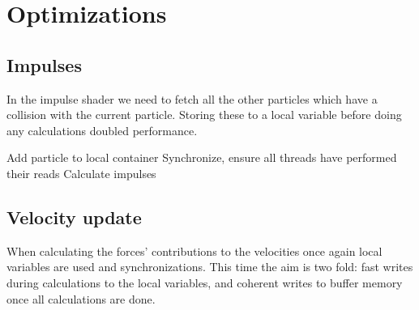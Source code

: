 \section{Optimizations}
\subsection{Impulses}
In the impulse shader we need to fetch all the other particles which have a collision
with the current particle. Storing these to a local variable before doing any
calculations doubled performance.

\begin{algorithm}[H]
  \begin{algorithmic}[1]
    Add particle to local container
  \EndFor
  \State Synchronize, ensure all threads have performed their reads
  \State Calculate impulses
\end{algorithmic}
\end{algorithm}

\subsection{Velocity update}
When calculating the forces' contributions to the velocities once again local variables
are used and synchronizations. This time the aim is two fold: fast writes during
calculations to the local variables, and coherent writes to buffer memory once all
calculations are done.

